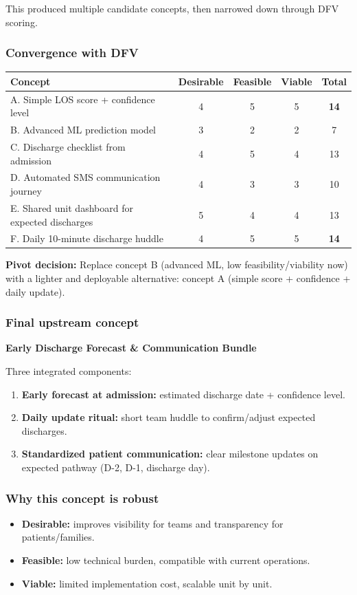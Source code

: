 {This produced multiple candidate concepts, then narrowed down through DFV scoring.

\subsubsection{Convergence with DFV}
\begin{table}[h]
\centering
\begin{tabular}{|p{7.5cm}|c|c|c|c|}
\hline
\textbf{Concept} & \textbf{Desirable} & \textbf{Feasible} & \textbf{Viable} & \textbf{Total} \\
\hline
A. Simple LOS score + confidence level & 4 & 5 & 5 & \textbf{14} \\
\hline
B. Advanced ML prediction model & 3 & 2 & 2 & 7 \\
\hline
C. Discharge checklist from admission & 4 & 5 & 4 & 13 \\
\hline
D. Automated SMS communication journey & 4 & 3 & 3 & 10 \\
\hline
E. Shared unit dashboard for expected discharges & 5 & 4 & 4 & 13 \\
\hline
F. Daily 10-minute discharge huddle & 4 & 5 & 5 & \textbf{14} \\
\hline
\end{tabular}
\end{table}

\textbf{Pivot decision:} Replace concept B (advanced ML, low feasibility/viability now) with a lighter and deployable alternative: concept A (simple score + confidence + daily update).

\subsubsection{Final upstream concept}
\textbf{Early Discharge Forecast \& Communication Bundle}

Three integrated components:
\begin{enumerate}
  \item \textbf{Early forecast at admission:} estimated discharge date + confidence level.
  \item \textbf{Daily update ritual:} short team huddle to confirm/adjust expected discharges.
  \item \textbf{Standardized patient communication:} clear milestone updates on expected pathway (D-2, D-1, discharge day).
\end{enumerate}

\subsubsection{Why this concept is robust}
\begin{itemize}
  \item \textbf{Desirable:} improves visibility for teams and transparency for patients/families.
  \item \textbf{Feasible:} low technical burden, compatible with current operations.
  \item \textbf{Viable:} limited implementation cost, scalable unit by unit.
\end{itemize}

}
